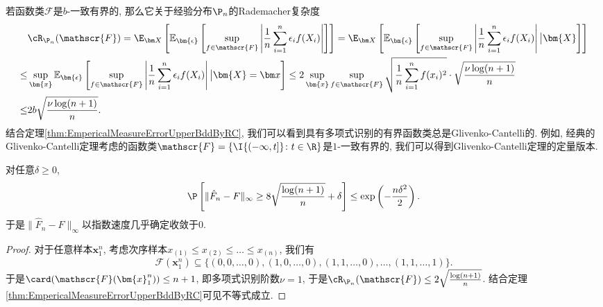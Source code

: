\begin{remark}
	若函数类$\mathscr{F}$是$b$-一致有界的, 那么它关于经验分布$\P_n$的Rademacher复杂度
	\begin{align*}
		& \cR_{\P_n}(\mathscr{F})
		= \E_{\bm X} \left[ \mathbb{E}_{\bm{\epsilon}} \left[ \sup_{f \in \mathscr{F}} \left| \frac{1}{n} \sum_{i=1}^n \epsilon_i f(X_i) \right| \right] \right]
		= \E_{\bm X} \left[ \mathbb{E}_{\bm{\epsilon}} \left[ \sup_{f \in \mathscr{F}} \left| \frac{1}{n} \sum_{i=1}^n \epsilon_i f(X_i) \right| \big| \bm{X} \right] \right] \\
		\leq & \sup_{\bm{x}} \mathbb{E}_{\bm{\epsilon}} \left[ \sup_{f \in \mathscr{F}} \left| \frac{1}{n} \sum_{i=1}^n \epsilon_i f(X_i) \right| \big| \bm{X} = \bm x \right]
		\leq 2 \sup_{\bm{x}} \sup_{f \in \mathscr{F}} \sqrt{\frac{1}{n} \sum_{i=1}^n f(x_i)^2} \cdot \sqrt{\frac{\nu \log(n+1)}{n}} \\
		\leq & 2 b \sqrt{\frac{\nu \log(n+1)}{n}}. 
	\end{align*} 
	结合定理\ref{thm:EmpericalMeasureErrorUpperBddByRC}, 我们可以看到具有多项式识别的有界函数类总是Glivenko-Cantelli的. 
	例如, 经典的Glivenko-Cantelli定理考虑的函数类$\mathscr{F} = \{\I{(- \infty, t]} \colon t \in \R \}$是$1$-一致有界的, 我们可以得到Glivenko-Cantelli定理的定量版本. 
\end{remark}

\begin{corollary}\label{thm:Glivenko-Cantelli}
	对任意$\delta \geq 0$, 
	\begin{equation*}
		\P\left[ \|\hat F_n - F \|_{\infty} \geq 8 \sqrt{\frac{\log(n+1)}{n}} + \delta \right]
		\leq \exp\left(- \frac{n \delta^2}{2}\right). 
	\end{equation*}
	于是$\|\hat F_n - F \|_{\infty}$以指数速度几乎确定收敛于$0$.   
\end{corollary}
\begin{proof}
	对于任意样本$\bm{x}_1^n$, 考虑次序样本$x_{(1)} \leq x_{(2)} \leq \dots \leq x_{(n)}$, 我们有
	\begin{equation*}
		\mathscr{F}(\bm{x}_1^n) \subseteq \{(0,0, \dots, 0), (1,0, \dots, 0), (1,1, \dots, 0), \dots, (1,1,\dots, 1) \}. 
	\end{equation*}
	于是$\card(\mathscr{F}(\bm{x}_1^n)) \leq n+1$, 即多项式识别阶数$\nu = 1$, 于是$\cR_{\P_n}(\mathscr{F}) \leq 2 \sqrt{\frac{\log(n+1)}{n}}$. 
	结合定理\ref{thm:EmpericalMeasureErrorUpperBddByRC}可见不等式成立. 
\end{proof}



